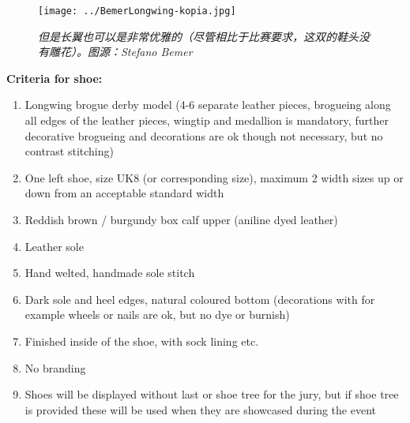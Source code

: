 \begin{paracol}{2}
    \switchcolumn
    \begin{figure}[h]
        \centering
        \texttt{[image: ../BemerLongwing-kopia.jpg]}
        \captionsetup{labelformat=empty}
        \caption{\textit{但是长翼也可以是非常优雅的（尽管相比于比赛要求，这双的鞋头没有雕花）。图源：\textnormal{{\tnr Stefano Bemer}}}}
        \label{}
    \end{figure}


    \switchcolumn*

    \bgroup\obeylines

        \textbf{Criteria for shoe:}
        \begin{enumerate}
            \item Longwing brogue derby model (4-6 separate leather pieces, brogueing along all edges of the leather pieces, wingtip and medallion is mandatory, further decorative brogueing and decorations are ok though not necessary, but no contrast stitching)
            \item One left shoe, size UK8 (or corresponding size), maximum 2 width sizes up or down from an acceptable standard width
            \item Reddish brown / burgundy box calf upper (aniline dyed leather)
            \item Leather sole
            \item Hand welted, handmade sole stitch
            \item Dark sole and heel edges, natural coloured bottom (decorations with for example wheels or nails are ok, but no dye or burnish)
            \item Finished inside of the shoe, with sock lining etc.
            \item No branding
            \item Shoes will be displayed without last or shoe tree for the jury, but if shoe tree is provided these will be used when they are showcased during the event
        \end{enumerate}

        \newpage


\end{paracol}
